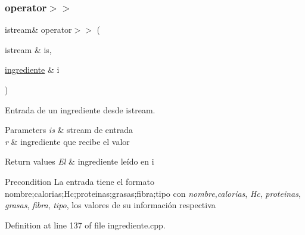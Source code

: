 \subsubsection{\texorpdfstring{operator$>$$>$}{operator>>}}
{\footnotesize\ttfamily istream\& operator$>$$>$ (\begin{DoxyParamCaption}\item[{istream \&}]{is,  }\item[{\hyperlink{classingrediente}{ingrediente} \&}]{i }\end{DoxyParamCaption})\hspace{0.3cm}{\ttfamily [friend]}}



Entrada de un ingrediente desde istream. 


\begin{DoxyParams}{Parameters}
{\em is} & stream de entrada \\
\hline
{\em r} & ingrediente que recibe el valor \\
\hline
\end{DoxyParams}

\begin{DoxyRetVals}{Return values}
{\em El} & ingrediente leído en i \\
\hline
\end{DoxyRetVals}
\begin{DoxyPrecond}{Precondition}
La entrada tiene el formato nombre;calorias;Hc;proteinas;grasas;fibra;tipo con {\itshape nombre},{\itshape calorias}, {\itshape Hc}, {\itshape proteinas}, {\itshape grasas}, {\itshape fibra}, {\itshape tipo}, los valores de su información respectiva 
\end{DoxyPrecond}


Definition at line 137 of file ingrediente.\+cpp.


